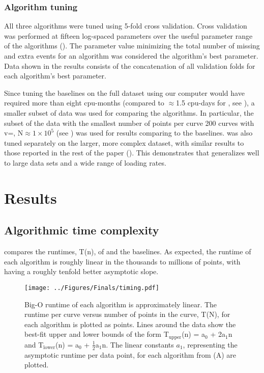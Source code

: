 \subsection{Algorithm tuning}

All three algorithms were tuned using 5-fold cross validation. Cross validation was performed at fifteen log-spaced parameters over the useful parameter range of the algorithms (). The parameter value minimizing the total number of missing and extra events for an algorithm was considered the algorithm's best parameter. Data shown in the results consists of the concatenation of all validation folds for each algorithm's best parameter. 

Since tuning the baselines on the full dataset using our computer would have required more than eight cpu-months (compared to $\approx$1.5 cpu-days for \name{}, see ), a smaller subset of data was used for comparing the algorithms. In particular, the subset of the data with the smallest number of points per curve \textemdash{} 200 curves with v=, N$\approx1\times10^{5}$ (see ) \textemdash{} was used for results comparing \name{} to the baselines. \name{} was also tuned separately on the larger, more complex dataset, with similar results to those reported in the rest of the paper (). This demonstrates that \name{} generalizes well to large data sets and a wide range of loading rates. 

\chapter{Results}

\section{Algorithmic time complexity}

 compares the runtimes, T(n), of \name{} and the baselines. As expected, the runtime of each algorithm is roughly linear in the thousands to millions of points, with \name{} having a roughly tenfold better asymptotic slope.  

\begin{figure}[htpb]
\caption[Runtime versus length of curve]{\noindent{} Big-O runtime of each algorithm is approximately linear.  The runtime per curve versus number of points in the curve, T(N), for each algorithm is plotted as points. Lines around the data show the best-fit upper and lower bounds of the form T$_{\mathrm{upper}}$(n) = a$_0$ + 2a$_1$n  and T$_{\mathrm{lower}}$(n) = a$_0$ + $\frac{1}{2}$a$_1$n.  The linear constants $a_1$, representing the asymptotic runtime per data point, for each algorithm from (A) are plotted. }
\centering
\texttt{[image: ../Figures/Finals/timing.pdf]}%
\end{figure}

